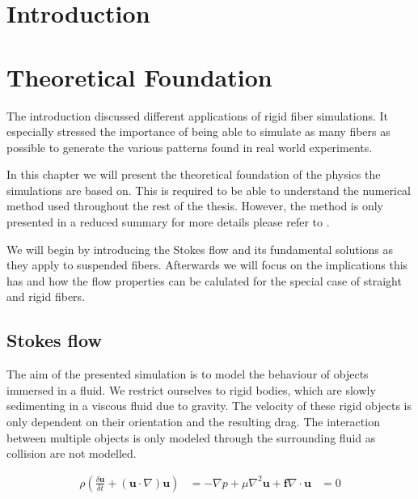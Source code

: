 \documentclass[a4paper,11pt]{kth-mag}
\begin{document}
\clearpage

\listoflistings

\mainmatter
\pagestyle{newchap}

\chapter{Introduction}

\chapter{Theoretical Foundation}
\label{cha:theoretical_foundation}
The introduction discussed different applications of rigid fiber simulations. It especially stressed the importance of being able to simulate as many fibers as possible to generate the various patterns found in real world experiments.

In this chapter we will present the theoretical foundation of the physics the simulations are based on. This is required to be able to understand the numerical method used throughout the rest of the thesis. However, the method is only presented in a reduced summary for more details please refer to \cite{}.

We will begin by introducing the Stokes flow and its fundamental solutions as they apply to suspended fibers. Afterwards we will focus on the implications this has and how the flow properties can be calulated for the special case of straight and rigid fibers.

\section{Stokes flow}

The aim of the presented simulation is to model the behaviour of objects immersed in a fluid. We restrict ourselves to rigid bodies, which are slowly sedimenting in a viscous fluid due to gravity. The velocity of these rigid objects is only dependent on their orientation and the resulting drag. The interaction between multiple objects is only modeled through the surrounding fluid as collision are not modelled.

\begin{equation}
  \label{eq:naviar_stokes_equations}
  \begin{aligned}
    \rho(\frac{\delta \mathbf{u}}{\delta t} + (\mathbf{u} \cdot \nabla)\mathbf{u}) &= -\nabla p + \mu\nabla^2\mathbf{u} + \mathbf{f}
    \nabla \cdot \mathbf{u} &= 0
  \end{aligned}
\end{equation}
\end{document}
